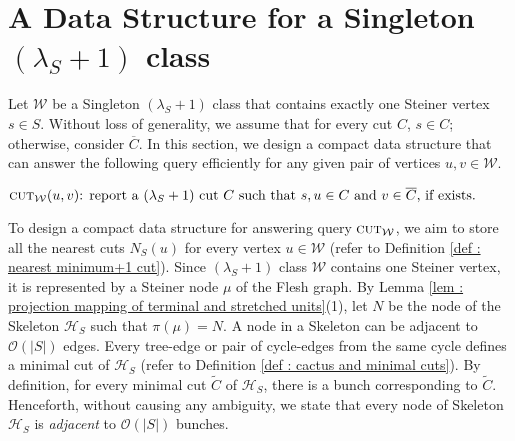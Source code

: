 \documentclass[letterpaper,11pt]{article}
\begin{document}
\section{A Data Structure for a Singleton $(\lambda_S+1)$ class} \label{sec : data structure for singleton class}
Let ${\mathcal W}$ be a Singleton $(\lambda_S+1)$ class that contains exactly one Steiner vertex $s\in S$. Without loss of generality, we assume that for every cut $C$, $s\in C$; otherwise, consider $\overline{C}$. In this section, we design a compact data structure that can answer the following query efficiently for any given pair of vertices $u,v\in {\mathcal W}$.
\begin{center}
    $\textsc{cut}_{\mathcal W}(u,v)\text{: report a $(\lambda_S+1)$ cut $C$ such that $s,u\in C$ and $v\in \overline{C}$, if exists.}$
\end{center}


\noindent
To design a compact data structure for answering query $\textsc{cut}_{\mathcal W}$, we aim to store all the nearest cuts $N_S(u)$ for every vertex $u\in {\mathcal W}$ (refer to Definition \ref{def : nearest minimum+1 cut}). Since $(\lambda_S+1)$ class ${\mathcal W}$ contains one Steiner vertex, it is represented by a Steiner node $\mu$ of the Flesh graph. By Lemma \ref{lem : projection mapping of terminal and stretched units}(1), let $N$ be the node of the Skeleton ${\mathcal H}_S$ such that $\pi(\mu)=N$. A node in a Skeleton can be adjacent to ${\mathcal O}(|S|)$ edges. Every tree-edge or pair of cycle-edges from the same cycle defines a minimal cut of ${\mathcal H}_S$ (refer to Definition \ref{def : cactus and minimal cuts}). By definition, for every minimal cut $\tilde C$ of ${\mathcal H}_S$, there is a bunch corresponding to $\tilde C$. Henceforth, without causing any ambiguity, we state that every node of Skeleton ${\mathcal H}_S$ is \textit{adjacent} to ${\mathcal O}(|S|)$ bunches. 
\end{document}
